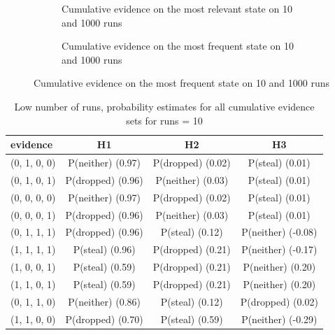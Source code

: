 \documentclass[11pt]{article}
\begin{document}
\begin{figure}[htbp]
\begin{center}
\begin{subfigure}{\textwidth}
\caption{Cumulative evidence on the most relevant state on 10 and 1000 runs}
\label{nobody}
\end{subfigure}

\begin{subfigure}{\textwidth}
\caption{Cumulative evidence on the most frequent state on 10 and 1000 runs }
\label{whirl}
\end{subfigure}
\end{center}
\end{figure}


\begin{table}
\begin{center}
\begin{tabular}{|l|c|c|c|}
\hline
evidence & H1 & H2 & H3 \\
\hline
(0, 1, 0, 0)&P(neither) (0.97) & P(dropped) (0.02) & P(steal) (0.01) \\
(0, 1, 0, 1)&P(dropped) (0.96) & P(neither) (0.03) & P(steal) (0.01) \\
(0, 0, 0, 0)&P(neither) (0.97) & P(dropped) (0.02) & P(steal) (0.01) \\
(0, 0, 0, 1)&P(dropped) (0.96) & P(neither) (0.03) & P(steal) (0.01) \\
(0, 1, 1, 1)&P(dropped) (0.96) & P(steal) (0.12) & P(neither) (-0.08) \\
(1, 1, 1, 1)&P(steal) (0.96) & P(dropped) (0.21) & P(neither) (-0.17) \\
(1, 0, 0, 1)&P(steal) (0.59) & P(dropped) (0.21) & P(neither) (0.20) \\
(1, 1, 0, 1)&P(steal) (0.59) & P(dropped) (0.21) & P(neither) (0.20) \\
(0, 1, 1, 0)&P(neither) (0.86) & P(steal) (0.12) & P(dropped) (0.02) \\
(1, 1, 0, 0)&P(dropped) (0.70) & P(steal) (0.59) & P(neither) (-0.29) \\
\hline
\end{tabular}
\end{center}
\caption{ Low number of runs, probability estimates for all cumulative evidence sets for runs =  10}
\label{journal}
\end{table}
\end{document}
